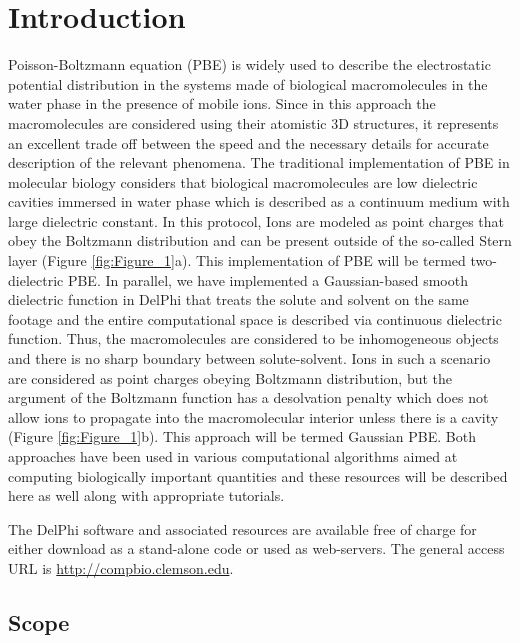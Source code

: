 \documentclass[9pt,tutorial]{livecoms}
\begin{document}
\section{Introduction}
Poisson-Boltzmann equation (PBE) is widely used to describe the electrostatic potential distribution in the systems made of biological macromolecules in the water phase in the presence of mobile ions\cite{xiao2017continuum,li2013progress,jurrus2018improvements,nguyen2017accurate}. Since in this approach the macromolecules are considered using their atomistic 3D structures, it represents an excellent trade off between the speed and the necessary details for accurate description of the relevant phenomena. The traditional implementation of PBE in molecular biology considers that biological macromolecules are low dielectric cavities immersed in water phase which is described as a continuum medium with large dielectric constant. In this protocol, Ions are modeled as point charges that obey the Boltzmann distribution and can be present outside of the so-called Stern layer (Figure \ref{fig:Figure_1}a). This implementation of PBE will be termed two-dielectric PBE. In parallel, we have implemented a Gaussian-based smooth dielectric function in DelPhi that treats the solute and solvent on the same footage and the entire computational space is described via continuous dielectric function\cite{chakravorty2018gaussian,jia2017treating,li2014modeling,li2013dielectric}. Thus, the macromolecules are considered to be inhomogeneous objects and there is no sharp boundary between solute-solvent. Ions in such a scenario are considered as point charges obeying Boltzmann distribution, but the argument of the Boltzmann function has a desolvation penalty which does not allow ions to propagate into the macromolecular interior unless there is a cavity (Figure \ref{fig:Figure_1}b). This approach will be termed Gaussian PBE. Both approaches have been used in various computational algorithms aimed at computing biologically important quantities and these resources will be described here as well along with appropriate tutorials.

The DelPhi software and associated resources are available free of charge for either download as a stand-alone code or used as web-servers. The general access URL is \url{http://compbio.clemson.edu}. 

\subsection{Scope}
\end{document}

